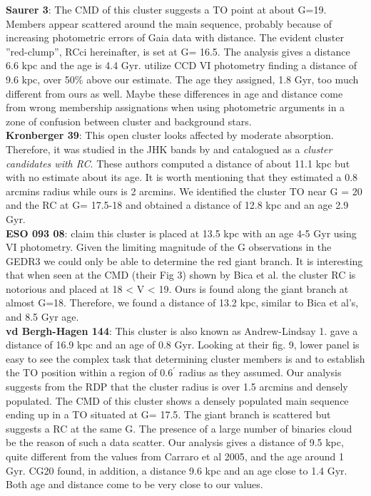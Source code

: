 \documentclass[draft]{aa}
\begin{document}
\textbf{Saurer 3}: The CMD of this cluster
suggests a TO point at about G=19. Members appear
scattered around the main sequence, probably because of increasing 
photometric errors of Gaia data with distance. The evident cluster ''red-clump'', RCci
hereinafter, is set at G= 16.5. The analysis gives a distance 6.6 kpc and the
age is 4.4 Gyr. \cite{Carraro_2003} utilize CCD VI photometry finding a
distance of 9.6 kpc, over 50\% above our estimate. The age they assigned, 1.8
Gyr, too much different from ours as well. Maybe these differences in age and
distance come from wrong membership assignations when using photometric
arguments in a zone of confusion between cluster and background stars.\\

\textbf{Kronberger 39}: This open cluster looks affected by moderate
absorption. Therefore, it was studied in the JHK bands by \cite{Kronberger_2006}
and catalogued as a \emph{cluster candidates with RC}. These authors computed a
distance of about 11.1 kpc but with no estimate about its
age. It is worth mentioning that they estimated a 0.8 arcmins
radius while ours is 2 arcmins. We identified the cluster TO near G = 20 and the
RC at G= 17.5-18 and obtained a distance of 12.8 kpc and an age 2.9 Gyr.\\

\textbf{ESO 093 08}: \cite{Bica_1999} claim this cluster is placed at 13.5 kpc with an age
4-5 Gyr using VI photometry. Given the limiting magnitude of the G
observations in the GEDR3 we could only be able to determine the red giant
branch. It is interesting that when seen at the CMD (their Fig 3) shown by
Bica et al.  the cluster RC is notorious and placed at 18 < V < 19. Ours is found
along the giant branch at almost G=18. Therefore, we found a distance of
13.2 kpc, similar to Bica et al's, and 8.5 Gyr age. \\

\textbf{vd Bergh-Hagen 144}: This cluster is also known as Andrew-Lindsay 1.
\cite{Carraro_2005_neglected} gave a distance of 16.9 kpc and an age of
0.8 Gyr.  Looking at their fig. 9, lower panel is easy to see the complex task
that determining cluster members is and to establish the TO position within a
region of $0.6^{\prime}$ radius as they assumed.  Our analysis suggests from the
RDP that the cluster radius is over 1.5 arcmins and densely populated.   The
CMD of this cluster shows a densely populated main sequence ending up in a TO
situated at G= 17.5. The giant branch is scattered but suggests a RC at the
same G.  The presence of a large number of binaries cloud be the reason of
such a data scatter. Our analysis gives a distance of 9.5 kpc, quite different
from the values from Carraro et al 2005, and the age around 1 Gyr.
CG20 found, in addition, a distance 9.6 kpc and an age close to 1.4
Gyr. Both age and distance come to be very close to our values.\\
\end{document}
